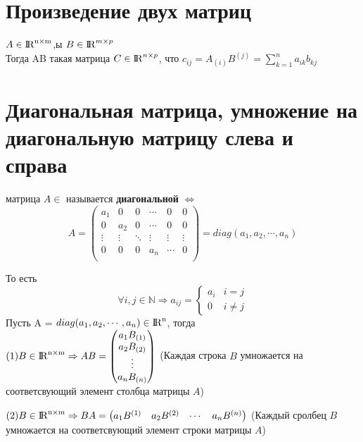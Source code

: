 \documentclass[a4paper,11pt]{report}
\DeclareMathOperator{\real}{\rm I\!R}
\DeclareMathOperator{\Mnm}{\real^{n\times m}}
\DeclareMathOperator{\Mn}{{\rm I\!R}^{n}}
\begin{document}
\section{Произведение двух матриц}
$A \in \Mnm $,ы
$B \in \real^{m\times p}$\\
Тогда AB \textendash такая матрица $C \in \real^{n\times p}$, что $c_{ij} = A_{(i)}B^{(j)} = \sum_{k=1}^{n} a_{ik}b_{kj}$
\section{Диагональная матрица, умножение на диагональную матрицу слева и справа}
\textcolor{Квадратная} матрица $A \in$ \textcolor{$\Mn$} называется \textbf{диагональной} $\Leftrightarrow$
\[
A = 
\begin{pmatrix}
a_1 & 0 & 0 & \cdots & 0 & 0\\
0 & a_2 & 0 & \cdots & 0 & 0\\
\vdots & \vdots & \ddots & \vdots & \vdots & \vdots\\
0 & 0 & 0 & a_n & \cdots & 0\\
\end{pmatrix}
= diag(a_1, a_2,\cdots, a_n)
\]

То есть
\[
\forall i, j \in \mathbb{N} \Rightarrow a_{ij} = 
\begin{cases}
  a_i & i = j\\
  0 & i \neq j
\end{cases}
\] 
\newline
\newline
Пусть A = $diag(a_1, a_2, \cdots, a_n) \in \Mn $, тогда \\

$
(1) B \in \Mnm \Rightarrow AB = 
\begin{pmatrix}
a_1{B_{(1)}}\\
a_2{B_{(2)}}\\
\vdots\\
a_n{B_{(n)}}\\
\end{pmatrix}
$ (Каждая строка $B$ умножается на соответсвующий элемент столбца матрицы $A$)

$
(2) B \in \Mnm \Rightarrow BA = 
\begin{pmatrix}
a_1{B^{(1)}} & a_2{B^{(2)}} & \cdots & a_n{B^{(n)}}\\
\end{pmatrix}
$ (Каждый сролбец $B$ умножается на соответсвующий элемент строки матрицы $A$)\\
\end{document}
